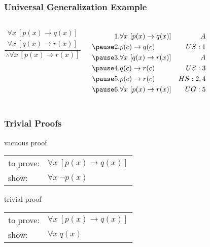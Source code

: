 \documentclass[dvipsnames]{beamer}
\begin{document}
\begin{frame}
  \frametitle{Universal Generalization Example}

  \begin{columns}
    \[
    \frac
      {
        \begin{array}{c}
          \forall x~[p(x) \rightarrow q(x)]\\
          \forall x~[q(x) \rightarrow r(x)]
        \end{array}
      }
      {
        \therefore \forall x~[p(x) \rightarrow r(x)]
      }
    \]

    \pause
    \begin{eqnarray*}
      1. & \forall x~[p(x) \rightarrow q(x)] & A\\\pause
      2. & p(c) \rightarrow q(c)             & US:1\\\pause
      3. & \forall x~[q(x) \rightarrow r(x)] & A\\\pause
      4. & q(c) \rightarrow r(c)             & US:3\\\pause
      5. & p(c) \rightarrow r(c)             & HS:2,4\\\pause
      6. & \forall x~[p(x) \rightarrow r(x)] & UG:5
    \end{eqnarray*}
  \end{columns}
\end{frame}

\begin{frame}
  \frametitle{Trivial Proofs}

  \begin{block}{vacuous proof}
    \begin{tabular}{ll}
      to prove: & $\forall x~[p(x) \rightarrow q(x)]$\\
      show:     & $\forall x~\neg p(x)$
    \end{tabular}
  \end{block}

  \bigskip
  \begin{block}{trivial proof}
    \begin{tabular}{ll}
      to prove: & $\forall x~[p(x) \rightarrow q(x)]$\\
      show:     & $\forall x~q(x)$
    \end{tabular}
  \end{block}
\end{frame}
\end{document}
